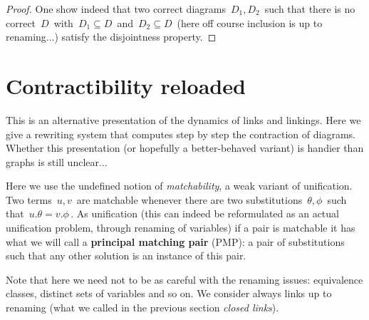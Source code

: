 \begin{proof}
One show indeed that two correct diagrams $\,D_1,D_2\,$ such that there is no correct $\,D\,$ with $\,D_1\subseteq D\,$ and $\,D_2\subseteq D\,$ (here off course inclusion is up to renaming...) satisfy the disjointness property.
\end{proof}



\section{Contractibility reloaded}

This is an alternative presentation of the dynamics of links and linkings. Here we give a rewriting system that computes step by step the contraction of diagrams. Whether this presentation (or hopefully a better-behaved variant) is handier than graphs is still unclear...

\medskip
Here we use the undefined notion of \textit{matchability}, a weak variant of unification. Two terms $\,u,v\,$ are matchable whenever there are two substitutions $\,\theta,\phi\,$ such that $\,u.\theta=v.\phi\,$. As unification (this can indeed be reformulated as an actual unification problem, through renaming of variables) if a pair is matchable it has what we will call a \textbf{principal matching pair} (PMP): a pair of substitutions such that any other solution is an instance of this pair.

\smallskip
Note that here we need not to be as careful with the renaming issues: equivalence classes, distinct sets of variables and so on. We consider always links up to renaming (what we called in the previous section \textit{closed links}).




